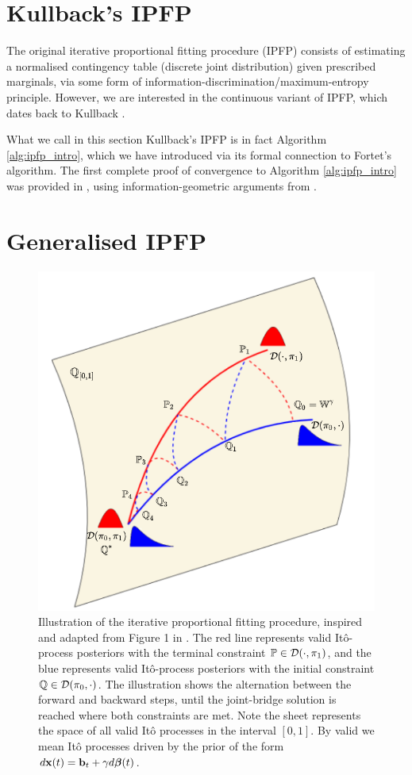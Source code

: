 \documentclass[a4paper,12pt,twoside,openright]{report}
\theoremstyle{definition}
\begin{document}
\section{Kullback's IPFP}
The original iterative proportional fitting procedure (IPFP) consists of estimating a normalised contingency table (discrete joint distribution) given prescribed marginals, via some form of information-discrimination/maximum-entropy principle. However, we are interested in the continuous variant of IPFP, which dates back to Kullback \citep{kullback1968probability}.

What we call in this section Kullback's IPFP is in fact Algorithm \ref{alg:ipfp_intro}, which we have introduced via its formal connection to Fortet's algorithm.  The first complete proof of convergence to Algorithm \ref{alg:ipfp_intro} was provided in \cite{ruschendorf1995convergence}, using information-geometric arguments from \cite{csiszar1975divergence}.

\section{Generalised IPFP}

\begin{figure}[t!]
    \centering
    \includegraphics[]{images/g-IPFP_ready.PNG}
    \caption{Illustration of the iterative proportional fitting procedure, inspired and adapted from Figure 1 in \cite{bernton2019schr}. The red line represents valid Itô-process posteriors with the terminal constraint ${\mathbb{P}} \in {\mathcal{D}}(\cdot, \pi_1)$, and the blue represents valid Itô-process posteriors with the initial constraint ${\mathbb{Q}} \in {\mathcal{D}}( \pi_0, \cdot)$. The illustration shows the alternation between the forward and backward steps, until the joint-bridge solution is reached where both constraints are met. Note the sheet represents the space of all valid Itô processes in the interval $[0,1]$. By valid we mean Itô processes driven by the prior of the form $d{\mathbf{x}}(t) = {\mathbf{b}}_t + \gamma d{\bm{\beta}}(t)$.}
    \label{fig:info_pro}
\end{figure}
\end{document}
